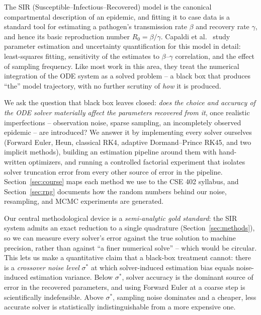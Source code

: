 The SIR (Susceptible--Infectious--Recovered) model is the canonical compartmental description of an
epidemic, and fitting it to case data is a standard tool for estimating a pathogen's transmission
rate $\beta$ and recovery rate $\gamma$, and hence its basic reproduction number $R_0 = \beta/\gamma$.
Capaldi et al.~\cite{capaldi2012} study parameter estimation and uncertainty quantification for this
model in detail: least-squares fitting, sensitivity of the estimates to $\beta$--$\gamma$ correlation,
and the effect of sampling frequency. Like most work in this area, they treat the numerical
integration of the ODE system as a solved problem -- a black box that produces ``the'' model
trajectory, with no further scrutiny of \emph{how} it is produced.

We ask the question that black box leaves closed: \emph{does the choice and accuracy of the ODE
solver materially affect the parameters recovered from it}, once realistic imperfections --
observation noise, sparse sampling, an incompletely observed epidemic -- are introduced? We answer
it by implementing every solver ourselves (Forward Euler, Heun, classical RK4, adaptive
Dormand--Prince RK45, and two implicit methods), building an estimation pipeline around them with
hand-written optimizers, and running a controlled factorial experiment that isolates solver
truncation error from every other source of error in the pipeline. Section~\ref{sec:course} maps
each method we use to the CSE 402 syllabus, and Section~\ref{sec:rng} documents how the random
numbers behind our noise, resampling, and MCMC experiments are generated.

Our central methodological device is a \emph{semi-analytic gold standard}: the SIR system admits an
exact reduction to a single quadrature (Section~\ref{sec:methods}), so we can measure every solver's
error against the true solution to machine precision, rather than against ``a finer numerical
solve'' -- which would be circular. This lets us make a quantitative claim that a black-box
treatment cannot: there is a \emph{crossover noise level} $\sigma^*$ at which solver-induced
estimation bias equals noise-induced estimation variance. Below $\sigma^*$, solver accuracy is the
dominant source of error in the recovered parameters, and using Forward Euler at a coarse step is
scientifically indefensible. Above $\sigma^*$, sampling noise dominates and a cheaper, less accurate
solver is statistically indistinguishable from a more expensive one.
